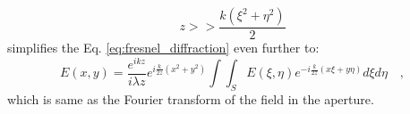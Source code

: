 \begin{equation}
\label{eq:fraunhofer_approx}
z >> \frac{k\left( \xi ^2 + \eta ^2\right)}{2}
\end{equation}
simplifies the Eq. \ref{eq:fresnel_diffraction} even further to:
\begin{equation}
\label{eq:fraunhofer_diffraction}
E\left( x,y\right) = \frac{e^{ikz}}{i\lambda z}e^{i\frac{k}{2z}(x^2+y^2)}\int \int _{S}  E \left( \xi , \eta \right) e^{-i\frac{k}{2z}(x\xi+y\eta )} d\xi d\eta \quad ,
\end{equation}
which is same as the Fourier transform of the field in the aperture.





